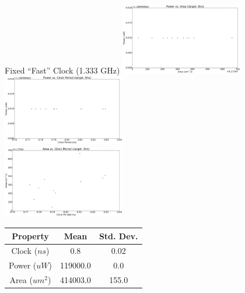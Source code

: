 \documentclass{beamer}
\begin{document}
\begin{frame}{Fixed ``Fast'' Clock (1.333 GHz)}
\noindent
\includegraphics[width=0.4\textwidth]{../img/dse_fast/powerVSarea.png}\hspace{0.2\textwidth}%
\includegraphics[width=0.4\textwidth]{../img/dse_fast/powerVSclock.png}\\[2em]
\includegraphics[width=0.4\textwidth]{../img/dse_fast/areaVSclock.png}\hspace{0.2\textwidth}%
    \tiny
    \begin{tabular}{c | c | c }
Property & Mean & Std. Dev.  \\ \hline
Clock ($ns$) & 0.8 & 0.02  \\
Power ($uW$) & 119000.0 & 0.0  \\
Area ($um^2$) & 414003.0 & 155.0 \\
\end{tabular} \par
\end{frame}





\begin{frame}

    
\end{frame}



\begin{frame}
    
\end{frame}
\end{document}
